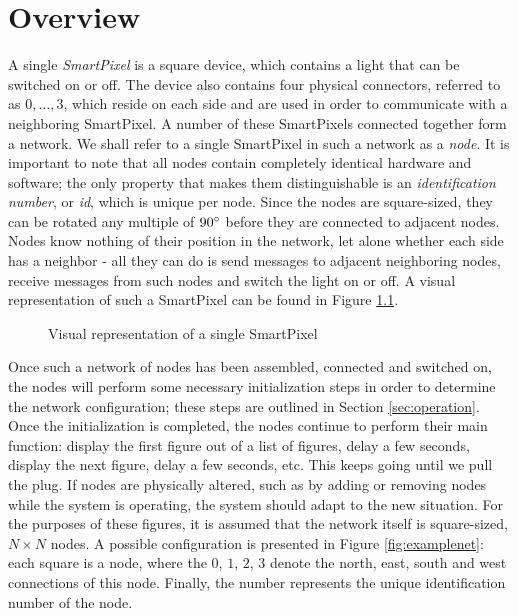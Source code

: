 \chapter{Overview}
\label{sec:overview}


A single \emph{SmartPixel} is a square device, which contains a light that can be switched on or off. The device also contains four physical connectors, referred to as $0, \dots, 3$, which reside on each side and are used in order to communicate with a neighboring SmartPixel. A number of these SmartPixels connected together form a network. We shall refer to a single SmartPixel in such a network as a \emph{node}. It is important to note that all nodes contain completely identical hardware and software; the only property that makes them distinguishable is an \emph{identification number}, or \emph{id}, which is unique per node. Since the nodes are square-sized, they can be rotated any multiple of $90 \degree$ before they are connected to adjacent nodes. Nodes know nothing of their position in the network, let alone whether each side has a neighbor - all they can do is send messages to adjacent neighboring nodes, receive messages from such nodes and switch the light on or off. A visual representation of such a SmartPixel can be found in Figure \ref{fig:smartpixel}.

\begin{figure}[h]
 \centering
 \caption{\label{fig:smartpixel} Visual representation of a single SmartPixel}
\end{figure}

Once such a network of nodes has been assembled, connected and switched on, the nodes will perform some necessary initialization steps in order to determine the network configuration; these steps are outlined in Section \ref{sec:operation}. Once the initialization is completed, the nodes continue to perform their main function: display the first figure out of a list of figures, delay a few seconds, display the next figure, delay a few seconds, etc. This keeps going until we pull the plug. If nodes are physically altered, such as by adding or removing nodes while the system is operating, the system should adapt to the new situation. For the purposes of these figures, it is assumed that the network itself is square-sized, $N \times N$ nodes. A possible configuration is presented in Figure \ref{fig:examplenet}: each square is a node, where the $0$, $1$, $2$, $3$ denote the north, east, south and west connections of this node. Finally, the number represents the unique identification number of the node.

